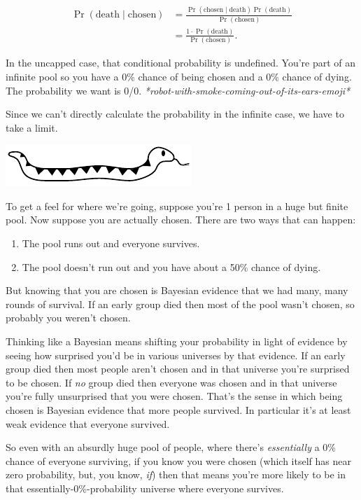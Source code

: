 \documentclass[article,twocolumn]{memoir}
\newcommand{\snakedivider}{
\vspace{.2em}
\begin{center}
\includegraphics[width=.25\linewidth]{snake}
\end{center}
\vspace{.1em}
}
\begin{document}
\begin{equation*}
\begin{split}
\Pr(\text{death} \mid \text{chosen}) & =
\frac{\Pr(\text{chosen} \mid \text{death}) \Pr(\text{death})}{\Pr(\text{chosen})} \\
& = \frac{1\cdot\Pr(\text{death})}{\Pr(\text{chosen})}.
\end{split}
\end{equation*}

In the uncapped case, that conditional probability is undefined. 
You're part of an infinite pool so you have a 0\% chance of being chosen and a 0\% chance of dying. 
The probability we want is 0/0. 
\emph{*robot-with-smoke-coming-out-of-its-ears-emoji*}

Since we can't directly calculate the probability in the infinite case, we have to take a limit.

\snakedivider

To get a feel for where we're going, suppose you're 1 person in a huge but finite pool.
Now suppose you are actually chosen. 
There are two ways that can happen: 
\begin{enumerate}
\item The pool runs out and everyone survives.
\item The pool doesn't run out and you have about a 50\% chance of dying. 
\end{enumerate}
But knowing that you are chosen is Bayesian evidence that we had many, many rounds of survival. 
If an early group died then most of the pool wasn't chosen, so probably you weren't chosen.

Thinking like a Bayesian means shifting your probability in light of evidence by seeing how surprised you'd be in various universes by that evidence.
If an early group died then most people aren't chosen and in that universe you're surprised to be chosen. 
If \emph{no} group died then everyone was chosen and in that universe you're fully unsurprised that you were chosen. 
That's the sense in which being chosen is Bayesian evidence that more people survived. 
In particular it's at least weak evidence that everyone survived.

So even with an absurdly huge pool of people, where there's \emph{essentially} a 0\% chance of everyone surviving, if you know you were chosen (which itself has near zero probability, but, you know, \emph{if}) then that means you're more likely to be in that essentially-0\%-probability universe where everyone survives.
\end{document}
